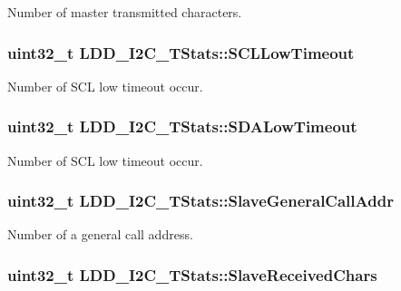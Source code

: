 Number of master transmitted characters. \hypertarget{struct_l_d_d___i2_c___t_stats_af6af8ae5b9414298f9a0e5d065c6f3d8}{
\subsubsection[{S\-C\-L\-Low\-Timeout}]{\setlength{\rightskip}{0pt plus 5cm}uint32\-\_\-t L\-D\-D\-\_\-\-I2\-C\-\_\-\-T\-Stats\-::\-S\-C\-L\-Low\-Timeout}}\label{struct_l_d_d___i2_c___t_stats_af6af8ae5b9414298f9a0e5d065c6f3d8}
Number of S\-C\-L low timeout occur. \hypertarget{struct_l_d_d___i2_c___t_stats_a9f3bfd5d01433711d763f893192da34e}{
\subsubsection[{S\-D\-A\-Low\-Timeout}]{\setlength{\rightskip}{0pt plus 5cm}uint32\-\_\-t L\-D\-D\-\_\-\-I2\-C\-\_\-\-T\-Stats\-::\-S\-D\-A\-Low\-Timeout}}\label{struct_l_d_d___i2_c___t_stats_a9f3bfd5d01433711d763f893192da34e}
Number of S\-C\-L low timeout occur. \hypertarget{struct_l_d_d___i2_c___t_stats_ac197175a686624b673584bf24e56b8ab}{
\subsubsection[{Slave\-General\-Call\-Addr}]{\setlength{\rightskip}{0pt plus 5cm}uint32\-\_\-t L\-D\-D\-\_\-\-I2\-C\-\_\-\-T\-Stats\-::\-Slave\-General\-Call\-Addr}}\label{struct_l_d_d___i2_c___t_stats_ac197175a686624b673584bf24e56b8ab}
Number of a general call address. \hypertarget{struct_l_d_d___i2_c___t_stats_a1f5f4c88b26ee91ad3ade3182c83b359}{
\subsubsection[{Slave\-Received\-Chars}]{\setlength{\rightskip}{0pt plus 5cm}uint32\-\_\-t L\-D\-D\-\_\-\-I2\-C\-\_\-\-T\-Stats\-::\-Slave\-Received\-Chars}}\label{struct_l_d_d___i2_c___t_stats_a1f5f4c88b26ee91ad3ade3182c83b359}
